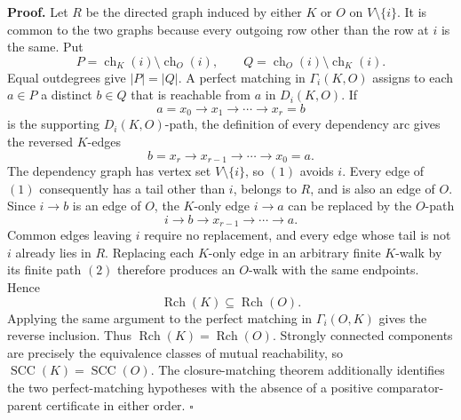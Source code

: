 \textbf{Proof.}
Let \(R\) be the directed graph induced by either \(K\) or \(O\) on \(V\setminus\{i\}\).  It is common to the two graphs because every outgoing row other than the row at \(i\) is the same.  Put
\[
 P=\operatorname{ch}_K(i)\setminus\operatorname{ch}_O(i),
 \qquad
 Q=\operatorname{ch}_O(i)\setminus\operatorname{ch}_K(i).
\]
Equal outdegrees give \(|P|=|Q|\).  A perfect matching in \(\Gamma_i(K,O)\) assigns to each \(a\in P\) a distinct \(b\in Q\) that is reachable from \(a\) in \(D_i(K,O)\).  If
\[
 a=x_0\to x_1\to\cdots\to x_r=b
\]
is the supporting \(D_i(K,O)\)-path, the definition of every dependency arc gives the reversed \(K\)-edges
\[
 b=x_r\to x_{r-1}\to\cdots\to x_0=a.
 \tag{1}
\]
The dependency graph has vertex set \(V\setminus\{i\}\), so \((1)\) avoids \(i\).  Every edge of \((1)\) consequently has a tail other than \(i\), belongs to \(R\), and is also an edge of \(O\).  Since \(i\to b\) is an edge of \(O\), the \(K\)-only edge \(i\to a\) can be replaced by the \(O\)-path
\[
 i\to b\to x_{r-1}\to\cdots\to a.
 \tag{2}
\]
Common edges leaving \(i\) require no replacement, and every edge whose tail is not \(i\) already lies in \(R\).  Replacing each \(K\)-only edge in an arbitrary finite \(K\)-walk by its finite path \((2)\) therefore produces an \(O\)-walk with the same endpoints.  Hence
\[
 \operatorname{Rch}(K)\subseteq\operatorname{Rch}(O).
\]
Applying the same argument to the perfect matching in \(\Gamma_i(O,K)\) gives the reverse inclusion.  Thus \(\operatorname{Rch}(K)=\operatorname{Rch}(O)\).  Strongly connected components are precisely the equivalence classes of mutual reachability, so \(\operatorname{SCC}(K)=\operatorname{SCC}(O)\).  The closure-matching theorem additionally identifies the two perfect-matching hypotheses with the absence of a positive comparator-parent certificate in either order. \(\square\)

